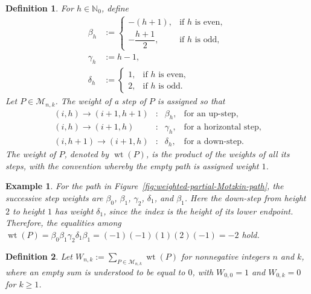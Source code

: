 \documentclass[11pt,letterpaper]{amsart}
\newtheorem{definition}{Definition}
\newtheorem{example}{Example}
\begin{document}
\begin{definition}\label{defineweight}
 For \(h\in\mathbb{N}_0\), define 
\begin{align*}
 \beta_h & :=
 \begin{cases}
 -(h+1),&\text{if \(h\) is even},\\[1mm]
 -\dfrac{h+1}{2},&\text{if \(h\) is odd},
 \end{cases} \\ 
 \gamma_h & :=h-1, \\ 
 \delta_h & :=
 \begin{cases}
 1,&\text{if \(h\) is even},\\
 2,&\text{if \(h\) is odd}.
 \end{cases}
\end{align*}
 Let \(P\in\mathcal{M}_{n,k}\). The \emph{weight} of a step of \(P\) is assigned so that 
\[
 \begin{array}{rcll}
 (i,h)\longrightarrow(i+1,h+1)
 &:& \beta_h,
 &\text{for an up-step},\\[1mm]
 (i,h)\longrightarrow(i+1,h)
 &:& \gamma_h,
 &\text{for a horizontal step},\\[1mm]
 (i,h+1)\longrightarrow(i+1,h)
 &:& \delta_h,
 &\text{for a down-step}.
 \end{array}
\]
 The \emph{weight} of $P$, denoted by \(\operatorname{wt}(P)\), is the product
of the weights of all its steps, with the convention whereby the empty path is assigned weight \(1\). 
\end{definition}

\begin{example}
 For the path in Figure~\ref{fig:weighted-partial-Motzkin-path}, the successive
step weights are
$\beta_0$, 
$\beta_1$, 
$\gamma_2$, $\delta_1$, and $\beta_1$. 
 Here the down-step from height \(2\) to height \(1\) has weight
\(\delta_1\), since the index is the height of its lower endpoint. Therefore, the equalities among 
$ \operatorname{wt}(P)
 =\beta_0\beta_1\gamma_2\delta_1\beta_1 
 =(-1)(-1)(1)(2)(-1) 
 =-2$ hold. 
 \end{example}

\begin{definition}\label{defineWnk}
 Let 
$
 W_{n,k}:=
 \sum_{P\in\mathcal{M}_{n,k}}\operatorname{wt}(P)$ 
 for nonnegative integers $n$ and $k$, 
 where an empty sum is understood to be equal to $0$, with $
 W_{0,0}=1$ and 
 $ W_{0,k}=0$ for $k \geq 1$. 
\end{definition}
\end{document}

